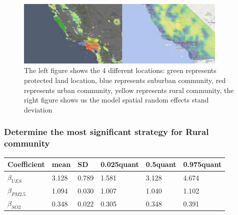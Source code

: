 \documentclass{mcmthesis}
\begin{document}
\begin{itemize}
\begin{figure}[htb]
    \centering
    \includegraphics[width=0.9\textwidth]{images/compare.png}
    \caption{The left figure shows the 4 different locations: green represents protected land location, blue represents suburban community, red represents urban community, yellow represents rural community, the right figure shows us the model spatial random effects stand deviation }
    \label{pre1}
\end{figure}

\end{itemize}

\subsubsection{Determine the most significant strategy for Rural community}
\begin{center}
\begin{tabular}{llllll}
\hline
Coefficient & mean & SD & 0.025quant & 0.5quant & 0.975quant\\
\hline
$\beta_{UES}$& 3.128 & 0.789 & 1.581 & 3.128 & 4.674         \\
$\beta_{PM2.5}$& 1.094 & 0.030 & 1.007 & 1.040 & 1.102      \\
$\beta_{SO2}$& 0.348 & 0.022 & 0.305 & 0.348 & 0.391            \\
\hline 
                                
\end{tabular}
\end{center}
\end{document}
